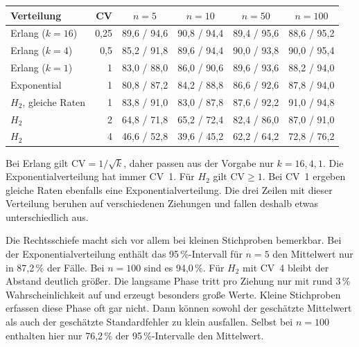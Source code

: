 \documentclass[a4paper,11pt]{article}
\begin{document}
\begin{center}
\begin{tabular}{@{}lrcccc@{}}
\toprule
Verteilung & CV & \(n=5\) & \(n=10\) & \(n=50\) & \(n=100\) \\
\midrule
Erlang (\(k=16\)) & 0,25 & 89,6 / 94,6 & 90,8 / 94,4 & 89,4 / 95,6 & 88,6 / 95,2 \\
Erlang (\(k=4\))  & 0,5  & 85,2 / 91,8 & 89,6 / 94,4 & 90,0 / 93,8 & 90,0 / 95,4 \\
Erlang (\(k=1\))  & 1    & 83,0 / 88,0 & 86,0 / 90,6 & 89,6 / 93,6 & 88,2 / 94,0 \\
Exponential      & 1    & 80,8 / 87,2 & 84,2 / 88,8 & 86,6 / 92,6 & 87,8 / 94,0 \\
\(H_2\), gleiche Raten & 1 & 83,8 / 91,0 & 83,0 / 87,8 & 87,6 / 92,2 & 91,0 / 94,8 \\
\(H_2\)          & 2    & 64,8 / 71,8 & 65,2 / 72,4 & 82,4 / 86,0 & 87,0 / 91,0 \\
\(H_2\)          & 4    & 46,6 / 52,8 & 39,6 / 45,2 & 62,2 / 64,2 & 72,8 / 76,2 \\
\bottomrule
\end{tabular}
\end{center}

Bei Erlang gilt \(\mathrm{CV}=1/\sqrt{k}\), daher passen aus der Vorgabe
nur \(k=16,4,1\). Die Exponentialverteilung hat immer CV~1.
Für \(H_2\) gilt \(\mathrm{CV}\geq1\). Bei CV~1 ergeben gleiche Raten
ebenfalls eine Exponentialverteilung. Die drei Zeilen mit dieser
Verteilung beruhen auf verschiedenen Ziehungen und fallen deshalb
etwas unterschiedlich aus.

Die Rechtsschiefe macht sich vor allem bei kleinen Stichproben bemerkbar.
Bei der Exponentialverteilung enthält das 95\,\%-Intervall für \(n=5\)
den Mittelwert nur in 87,2\,\% der Fälle. Bei \(n=100\) sind es 94,0\,\%.
Für \(H_2\) mit CV~4 bleibt der Abstand deutlich größer. Die langsame Phase
tritt pro Ziehung nur mit rund 3\,\% Wahrscheinlichkeit auf und erzeugt
besonders große Werte. Kleine Stichproben erfassen diese Phase oft gar
nicht. Dann können sowohl der geschätzte Mittelwert als auch der
geschätzte Standardfehler zu klein ausfallen. Selbst bei \(n=100\)
enthalten hier nur 76,2\,\% der 95\,\%-Intervalle den Mittelwert.
\end{document}
